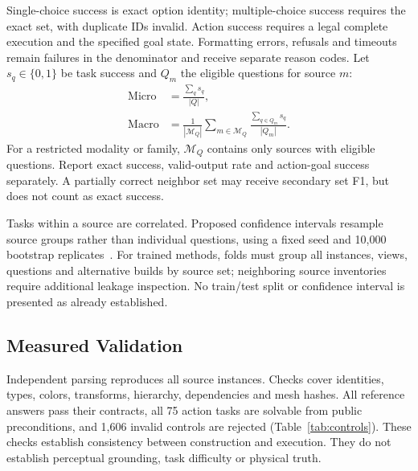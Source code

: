 \documentclass[10pt,twocolumn,letterpaper]{article}
\begin{document}
Single-choice success is exact option identity; multiple-choice success
requires the exact set, with duplicate IDs invalid. Action success
requires a legal complete execution and the specified goal state.
Formatting errors, refusals and timeouts remain failures in the
denominator and receive separate reason codes. Let $s_q\in\{0,1\}$ be
task success and $Q_m$ the eligible questions for source $m$:
\begin{align}
\mathrm{Micro}&=\frac{\sum_q s_q}{|Q|},\\
\mathrm{Macro}&=\frac{1}{|\mathcal M_Q|}
 \sum_{m\in\mathcal M_Q}\frac{\sum_{q\in Q_m}s_q}{|Q_m|}.
\end{align}
For a restricted modality or family, $\mathcal M_Q$ contains only
sources with eligible questions. Report exact success, valid-output
rate and action-goal success separately. A partially correct neighbor
set may receive secondary set F1, but does not count as exact success.

Tasks within a source are correlated. Proposed confidence intervals
resample source groups rather than individual questions, using a fixed
seed and 10,000 bootstrap replicates~\cite{efron1979bootstrap}.
For trained methods, folds must group all instances, views, questions
and alternative builds by source set; neighboring source inventories
require additional leakage inspection. No train/test split or
confidence interval is presented as already established.

\begin{table}[t]
\centering\small
\caption{Measured software and choice controls. Reference checks use
privileged answers; the action solver uses public preconditions. Rates
are contract validation or single-choice controls, not MLLM scores.}
\label{tab:controls}

\end{table}

\subsection{Measured Validation}
Independent parsing reproduces all \LDrawParts{} source instances.
Checks cover identities, types, colors, transforms, hierarchy,
dependencies and mesh hashes. All \LDrawTasks{} reference answers pass
their contracts, all 75 action tasks are solvable from public
preconditions, and 1,606 invalid controls are rejected
(Table~\ref{tab:controls}). These checks establish consistency between
construction and execution. They do not establish perceptual grounding,
task difficulty or physical truth.
\end{document}
